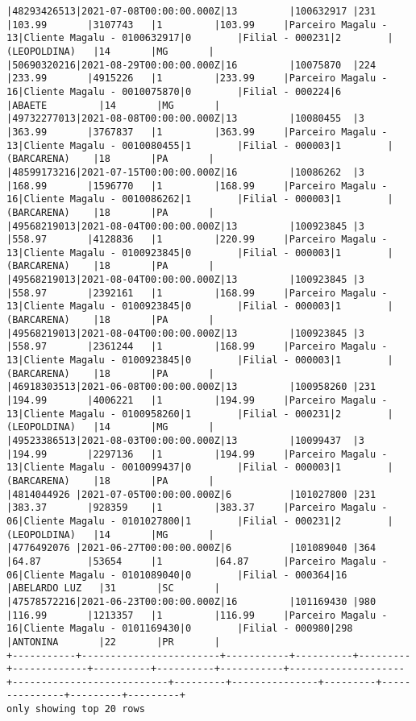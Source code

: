 \documentclass[11pt]{article}
\begin{document}
\begin{Verbatim}[commandchars=\\\{\}]
|48293426513|2021-07-08T00:00:00.000Z|13         |100632917 |231      |103.99       |3107743   |1         |103.99     |Parceiro Magalu - 13|Cliente Magalu - 0100632917|0        |Filial - 000231|2        |(LEOPOLDINA)   |14       |MG       |
|50690320216|2021-08-29T00:00:00.000Z|16         |10075870  |224      |233.99       |4915226   |1         |233.99     |Parceiro Magalu - 16|Cliente Magalu - 0010075870|0        |Filial - 000224|6        |ABAETE         |14       |MG       |
|49732277013|2021-08-08T00:00:00.000Z|13         |10080455  |3        |363.99       |3767837   |1         |363.99     |Parceiro Magalu - 13|Cliente Magalu - 0010080455|1        |Filial - 000003|1        |(BARCARENA)    |18       |PA       |
|48599173216|2021-07-15T00:00:00.000Z|16         |10086262  |3        |168.99       |1596770   |1         |168.99     |Parceiro Magalu - 16|Cliente Magalu - 0010086262|1        |Filial - 000003|1        |(BARCARENA)    |18       |PA       |
|49568219013|2021-08-04T00:00:00.000Z|13         |100923845 |3        |558.97       |4128836   |1         |220.99     |Parceiro Magalu - 13|Cliente Magalu - 0100923845|0        |Filial - 000003|1        |(BARCARENA)    |18       |PA       |
|49568219013|2021-08-04T00:00:00.000Z|13         |100923845 |3        |558.97       |2392161   |1         |168.99     |Parceiro Magalu - 13|Cliente Magalu - 0100923845|0        |Filial - 000003|1        |(BARCARENA)    |18       |PA       |
|49568219013|2021-08-04T00:00:00.000Z|13         |100923845 |3        |558.97       |2361244   |1         |168.99     |Parceiro Magalu - 13|Cliente Magalu - 0100923845|0        |Filial - 000003|1        |(BARCARENA)    |18       |PA       |
|46918303513|2021-06-08T00:00:00.000Z|13         |100958260 |231      |194.99       |4006221   |1         |194.99     |Parceiro Magalu - 13|Cliente Magalu - 0100958260|1        |Filial - 000231|2        |(LEOPOLDINA)   |14       |MG       |
|49523386513|2021-08-03T00:00:00.000Z|13         |10099437  |3        |194.99       |2297136   |1         |194.99     |Parceiro Magalu - 13|Cliente Magalu - 0010099437|0        |Filial - 000003|1        |(BARCARENA)    |18       |PA       |
|4814044926 |2021-07-05T00:00:00.000Z|6          |101027800 |231      |383.37       |928359    |1         |383.37     |Parceiro Magalu - 06|Cliente Magalu - 0101027800|1        |Filial - 000231|2        |(LEOPOLDINA)   |14       |MG       |
|4776492076 |2021-06-27T00:00:00.000Z|6          |101089040 |364      |64.87        |53654     |1         |64.87      |Parceiro Magalu - 06|Cliente Magalu - 0101089040|0        |Filial - 000364|16       |ABELARDO LUZ   |31       |SC       |
|47578572216|2021-06-23T00:00:00.000Z|16         |101169430 |980      |116.99       |1213357   |1         |116.99     |Parceiro Magalu - 16|Cliente Magalu - 0101169430|0        |Filial - 000980|298      |ANTONINA       |22       |PR       |
+-----------+------------------------+-----------+----------+---------+-------------+----------+----------+-----------+--------------------+---------------------------+---------+---------------+---------+---------------+---------+---------+
only showing top 20 rows


    \end{Verbatim}


    
    
    
    
\end{document}
